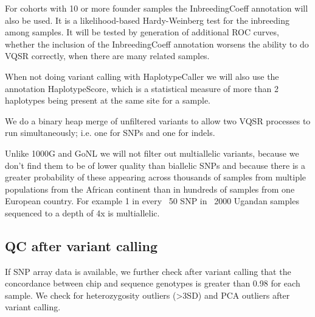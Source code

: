 For cohorts with 10 or more founder samples the InbreedingCoeff annotation will also be used. It is a likelihood-based Hardy-Weinberg test for the inbreeding among samples. It will be tested by generation of additional ROC curves, whether the inclusion of the InbreedingCoeff annotation worsens the ability to do VQSR correctly, when there are many related samples.

When not doing variant calling with HaplotypeCaller we will also use the annotation HaplotypeScore, which is a statistical measure of more than 2 haplotypes being present at the same site for a sample.

We do a binary heap merge of unfiltered variants to allow two VQSR processes to run simultaneously; i.e. one for SNPs and one for indels.

Unlike 1000G and GoNL we will not filter out multiallelic variants, because we don't find them to be of lower quality than biallelic SNPs and because there is a greater probability of these appearing across thousands of samples from multiple populations from the African continent than in hundreds of samples from one European country. For example 1 in every ~50 SNP in ~2000 Ugandan samples sequenced to a depth of 4x is multiallelic.

\subsection{QC after variant calling}
If SNP array data is available, we further check after variant calling that the concordance between chip and sequence genotypes is greater than 0.98 for each sample. We check for heterozygosity outliers (\textgreater3SD) and PCA outliers after variant calling.